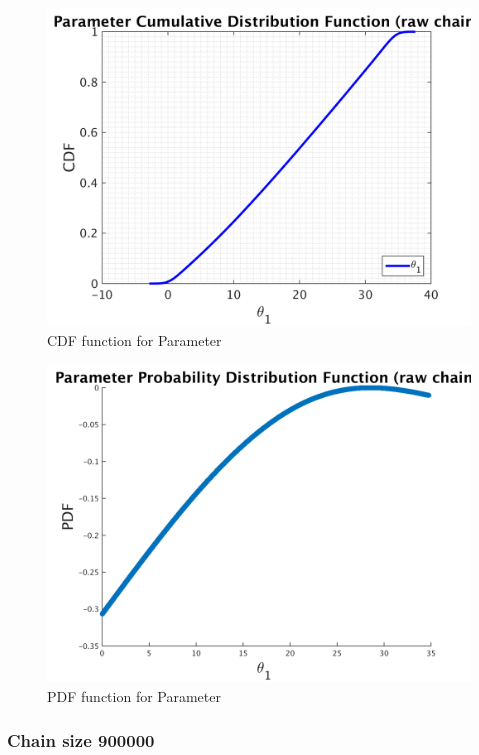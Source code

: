 \begin{figure}[h!]
  
  \centering
   \includegraphics[scale=0.75]{output_700000/simple_ip_cdf_raw}
   \caption{CDF function for Parameter }
\end{figure}



\begin{figure}[h!]
  
  \centering
   \includegraphics[scale=0.75]{output_700000/ip_logLike_unified}
   \caption{PDF function for Parameter }
\end{figure}



\subsubsection{Chain size 900000 }

